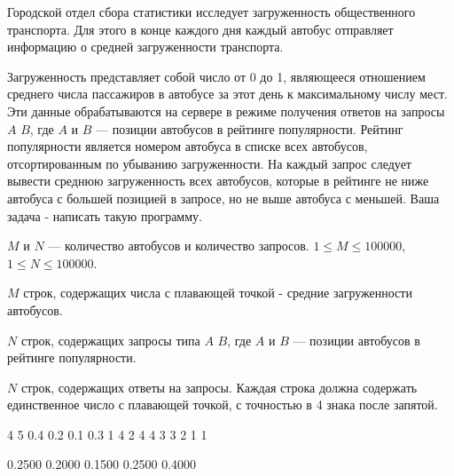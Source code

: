 
Городской отдел сбора статистики исследует загруженность общественного транспорта. Для этого в конце каждого дня каждый автобус отправляет информацию о средней загруженности транспорта.

Загруженность представляет собой число от 0 до 1, являющееся отношением среднего числа пассажиров в автобусе за этот день к максимальному числу мест. Эти данные обрабатываются на сервере в режиме получения ответов на запросы $A$ $B$, где $A$ и $B$ — позиции автобусов в рейтинге популярности. Рейтинг популярности является номером автобуса в списке всех автобусов, отсортированным по убыванию загруженности. На каждый запрос следует вывести среднюю загруженность всех автобусов, которые в рейтинге не ниже автобуса с большей позицией в запросе, но не выше автобуса с меньшей. Ваша задача - написать такую программу.


$M$ и $N$ — количество автобусов и количество запросов. $1 \leq M \leq 100000$, $1 \leq N \leq 100000$.

$M$ строк, содержащих числа с плавающей точкой - средние загруженности автобусов.

$N$ строк, содержащих запросы типа $A$ $B$, где $A$ и $B$ — позиции автобусов в рейтинге популярности.

\outputfmtSection

$N$ строк, содержащих ответы на запросы. Каждая строка должна содержать единственное число с плавающей точкой, с точностью в 4 знака после запятой.


\begin{myverbbox}[\small]{\vinput}
    4 5
    0.4
    0.2
    0.1
    0.3
    1 4
    2 4
    4 3
    3 2
    1 1
\end{myverbbox}
\begin{myverbbox}[\small]{\voutput}
    0.2500
    0.2000
    0.1500
    0.2500
    0.4000
\end{myverbbox}

